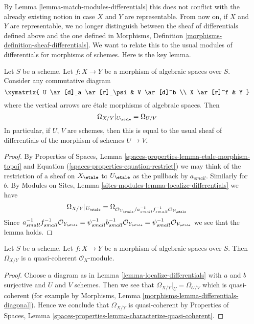 \noindent
By
Lemma \ref{lemma-match-modules-differentials}
this does not conflict with the already existing
notion in case $X$ and $Y$ are representable. From now on, if $X$ and $Y$
are representable, we no longer distinguish between the sheaf of differentials
defined above and the one defined in
Morphisms, Definition \ref{morphisms-definition-sheaf-differentials}.
We want to relate this to the usual modules of differentials for
morphisms of schemes. Here is the key lemma.

\begin{lemma}
\label{lemma-localize-differentials}
Let $S$ be a scheme. Let $f : X \to Y$ be a morphism of algebraic spaces
over $S$. Consider any commutative diagram
$$
\xymatrix{
U \ar[d]_a \ar[r]_\psi & V \ar[d]^b \\
X \ar[r]^f & Y
}
$$
where the vertical arrows are \'etale morphisms of algebraic spaces. Then
$$
\Omega_{X/Y}|_{U_\etale} = \Omega_{U/V}
$$
In particular, if $U$, $V$ are schemes, then this is equal to the usual
sheaf of differentials of the morphism of schemes $U \to V$.
\end{lemma}

\begin{proof}
By
Properties of Spaces, Lemma \ref{spaces-properties-lemma-etale-morphism-topoi}
and Equation (\ref{spaces-properties-equation-restrict})
we may think of the restriction of a sheaf on $X_\etale$ to
$U_\etale$ as the pullback by $a_{small}$. Similarly for $b$. By
Modules on Sites, Lemma \ref{sites-modules-lemma-localize-differentials}
we have
$$
\Omega_{X/Y}|_{U_\etale} =
\Omega_{\mathcal{O}_{U_\etale}/
a_{small}^{-1}f_{small}^{-1}\mathcal{O}_{Y_\etale}}
$$
Since $a_{small}^{-1}f_{small}^{-1}\mathcal{O}_{Y_\etale}
= \psi_{small}^{-1}b_{small}^{-1}\mathcal{O}_{Y_\etale}
= \psi_{small}^{-1}\mathcal{O}_{V_\etale}$ we see that the lemma holds.
\end{proof}

\begin{lemma}
\label{lemma-module-differentials-quasi-coherent}
Let $S$ be a scheme. Let $f : X \to Y$ be a morphism of algebraic spaces
over $S$. Then $\Omega_{X/Y}$ is a quasi-coherent $\mathcal{O}_X$-module.
\end{lemma}

\begin{proof}
Choose a diagram as in
Lemma \ref{lemma-localize-differentials}
with $a$ and $b$ surjective and $U$ and $V$ schemes.
Then we see that $\Omega_{X/Y}|_U = \Omega_{U/V}$ which is
quasi-coherent (for example by
Morphisms, Lemma \ref{morphisms-lemma-differentials-diagonal}).
Hence we conclude that $\Omega_{X/Y}$ is quasi-coherent by
Properties of Spaces,
Lemma \ref{spaces-properties-lemma-characterize-quasi-coherent}.
\end{proof}

